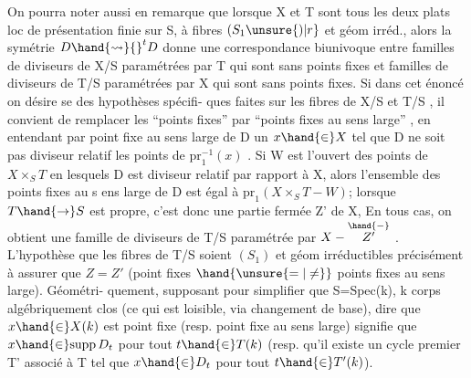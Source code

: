 
On pourra noter aussi en remarque que lorsque X et T sont tous les
deux plats loc de présentation finie sur S, à fibres $(S_1\unsure{)|r}$ et géom irréd.,
alors la symétrie $D \hand{\rightsquigarrow} {}^{t}D$ donne une correspondance biunivoque entre
familles de diviseurs de X/S paramétrées par T qui sont sans points fixes
et familles de diviseurs de T/S paramétrées par X qui sont sans points
fixes. Si dans cet énoncé on désire se  des hypothèses spécifi-%
ques faites sur les fibres de X/S et T/S , il convient de remplacer
les ``points fixes'' par ``points fixes au sens large'' , en entendant par
point fixe au sens large de D un $x \hand{\in} X$ tel que D ne soit pas diviseur
 relatif   les points de $\mathrm{pr}_1^{-1}(x)$ . Si W est l'ouvert des
points de $X\times_S T$ en lesquels D est  diviseur  relatif par
rapport à X, alors l'ensemble des points fixes au s ens large de D est
 égal à $\mathrm{pr}_1(X\times_S T - W)$; lorsque $T \hand{\to} S$ est propre, c'est donc
une partie fermée Z' de X,  En tous cas, on obtient une
famille de diviseurs de T/S paramétrée par $X-\overset{\hand{\relbar}}{Z'}$ . L'hypothèse que les
fibres de T/S soient $(S_1)$ et géom irréductibles   précisément à
assurer que $Z=Z'$ (point fixes $\hand{\unsure{=|\ne}}$ points fixes au sens large). Géométri-%
quement, supposant pour simplifier que S=Spec(k), k corps algébriquement
clos (ce qui est loisible,  via changement de base), dire que $x \hand{\in} X(k)$
est point fixe (resp. point fixe au sens large) signifie que $x \hand{\in} \mathrm{supp}\, D_t$
pour tout $t \hand{\in} T(k)$ (resp. qu'il existe un cycle premier T' associé à T
tel que $x \hand{\in} D_t$ pour tout $t \hand{\in} T'(k)$).

